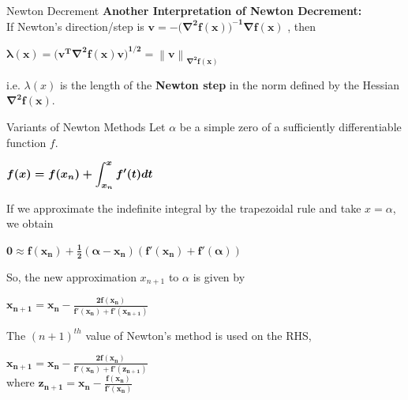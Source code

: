 \documentclass[10pt]{beamer}
\begin{document}
\begin{frame}[fragile]{Newton Decrement}
 \textbf{Another Interpretation of Newton Decrement:}
 \vspace{2mm}\ \\
 If Newton's 
 direction/step is $\boldsymbol{v=-\big(\nabla^{2}f(x)\big)^{-1}\nabla f(x)}$ , then 
 \begin{center}
     $\boldsymbol{\lambda(x)=\big(v^{T}\nabla^{2}f(x)v\big)^{1/2}= \left\|v\right\|_{\nabla^{2}f(x)}}$
 \end{center}
 i.e. $\lambda(x)$ is the length of the \textbf{Newton step} in the norm defined by
the Hessian $\boldsymbol{\nabla^{2}f(x)}$.
\end{frame}

\begin{frame}[fragile]{Variants of Newton Methods}
 Let $\alpha$ be a simple zero of a sufficiently differentiable function $f$. 
 \vspace{2mm}\ \\
 \begin{center}
  $\boldsymbol{f(x)=f(x_n) + \mathlarger{\int_{x_n}^{x} f'(t) dt}}$    
 \end{center}
 If we approximate the indefinite integral by the trapezoidal rule and take $x=\alpha$, we obtain
 \begin{center}
     $\boldsymbol{0 \approx f(x_n)+\frac{1}{2}(\alpha-x_n)(f'(x_n)+f'(\alpha))}$
 \end{center}
 So, the new approximation $x_{n+1}$ to $\alpha$ is given by 
 \begin{center}
     $\boldsymbol{x_{n+1}=x_n-\frac{2f(x_n)}{f'(x_n)+f'(x_{n+1})}}$
 \end{center}
 The $(n+1)^{th}$ value of Newton's method is used on the RHS,
 \begin{center}
     $\boldsymbol{x_{n+1}=x_n-\frac{2f(x_n)}{f'(x_n)+f'(z_{n+1})}}$
     \vspace{2mm}\ \\
     where $\boldsymbol{z_{n+1}=x_n-\frac{f(x_n)}{f'(x_n)}}$
 \end{center}
\end{frame}
\end{document}
